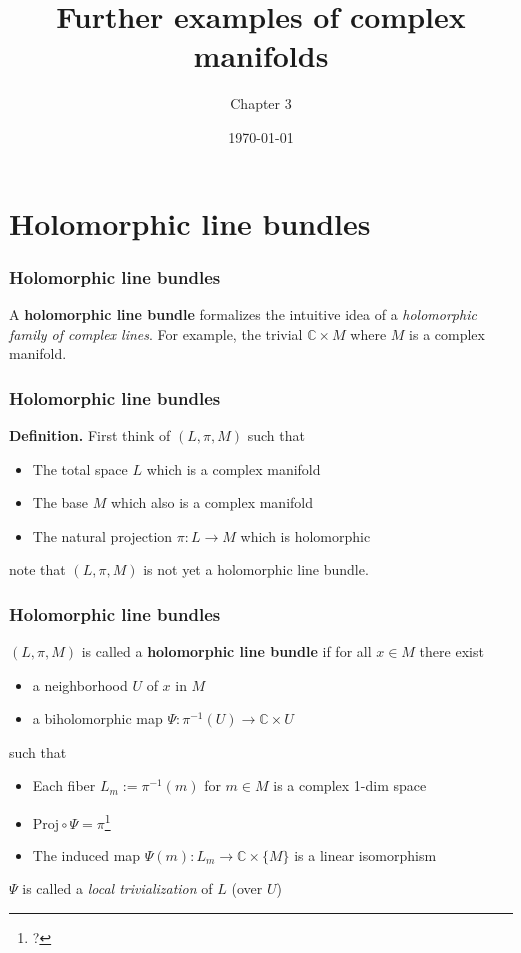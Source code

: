 \documentclass{beamer}
\title{Further examples of complex manifolds}
\author{Chapter 3}
\institute{Complex Singularities}
\date{\today}
\begin{document}
\begin{frame}
\titlepage
\end{frame}




\section{Holomorphic line bundles}

\begin{frame}
\frametitle{Holomorphic line bundles}

A \textbf{holomorphic line bundle} formalizes the intuitive idea of a \textit{holomorphic family of complex lines}.\newline
For example, the trivial $\mathbb{C} \times M$ where $M$ is a complex manifold.
\end{frame}


\begin{frame}
\frametitle{Holomorphic line bundles}

\textbf{Definition.} First think of $(L, \pi, M)$ such that \begin{itemize}
    \item The total space $L$ which is a complex manifold
    \item The base $M$ which also is a complex manifold
    \item The natural projection $\pi : L \to M$ which is holomorphic
\end{itemize}note that $(L,\pi,M)$ is not yet a holomorphic line bundle.

\end{frame}


\begin{frame}
\frametitle{Holomorphic line bundles}

$(L,\pi,M)$ is called a \textbf{holomorphic line bundle} if for all $x \in M$ there exist\begin{itemize}
    \item a neighborhood $U$ of $x$ in $M$
    \item a biholomorphic map $\Psi: \pi^{-1}(U) \to \mathbb{C} \times U$
\end{itemize}

such that \begin{itemize}
    \item Each fiber $L_m := \pi^{-1}(m)$ for $m \in M$ is a complex 1-dim space
    \item $\text{Proj} \circ \Psi = \pi$\footnote{?}
    \item The induced map $\Psi(m):L_m \to \mathbb{C}\times \{M\}$ is a linear isomorphism
\end{itemize}

$\Psi$ is called a \textit{local trivialization} of $L$ (over $U$)
\end{frame}
\end{document}
